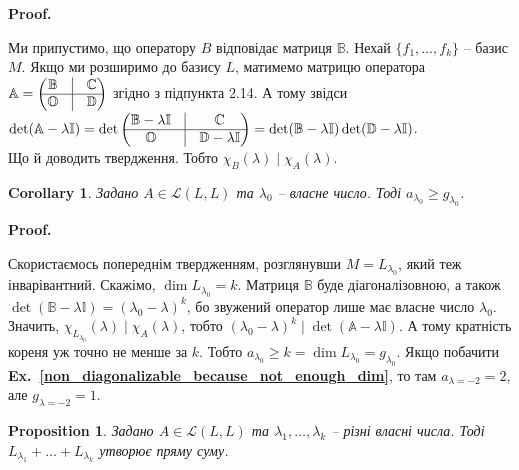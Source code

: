 \documentclass[a4paper, 10pt]{article}
\makeatletter
\theoremstyle{theoremdd}
\newtheorem{proposition}[theorem]{Proposition}
\newtheorem{corollary}[theorem]{Corollary}
\newcommand\exref[1]{\textbf{Ex.~\ref{#1}}}
\renewenvironment{proof}[1][Proof.\\]{\par
\pushQED{\hfill \qed}%
\normalfont \topsep6\p@\@plus6\p@\relax
\trivlist
\item\relax
{\bfseries
#1\@addpunct{.}}\hspace\labelsep\ignorespaces
}{%
\popQED\endtrivlist\@endpefalse
}
\makeatother
\begin{document}
\begin{proof}
Ми припустимо, що оператору $B$ відповідає матриця $\mathbb{B}$. Нехай $\{f_1,\dots,f_k\}$ -- базис $M$. Якщо ми розширимо до базису $L$, матимемо матрицю оператора $\mathbb{A} = \begin{pmatrix}
\mathbb{B} & \vline & \mathbb{C} \\
\hline
\mathbb{O} & \vline & \mathbb{D}
\end{pmatrix}$ згідно з підпункта 2.14. А тому звідси\\
$\det (\mathbb{A} - \lambda \mathbb{I}) = \det \begin{pmatrix}
\mathbb{B}- \lambda \mathbb{I} & \vline & \mathbb{C} \\
\hline
\mathbb{O} & \vline & \mathbb{D}- \lambda \mathbb{I}
\end{pmatrix} = \det(\mathbb{B}-\lambda \mathbb{I}) \det (\mathbb{D} - \lambda \mathbb{I})$.\\
Що й доводить твердження. Тобто $\chi_B(\lambda) \mid \chi_A(\lambda)$.
\end{proof}

\begin{corollary}
Задано $A \in \mathcal{L}(L,L)$ та $\lambda_0$ -- власне число. Тоді $a_{\lambda_0} \geq g_{\lambda_0}$.
\end{corollary}

\begin{proof}
Скористаємось попереднім твердженням, розглянувши $M = L_{\lambda_0}$, який теж інварівантний. Скажімо, $\dim L_{\lambda_0} = k$. Матриця $\mathbb{B}$ буде діагоналізовною, а також $\det (\mathbb{B}-\lambda \mathbb{I}) = (\lambda_0-\lambda)^k$, бо звужений оператор лише має власне число $\lambda_0$. Значить, $\chi_{L_{\lambda_0}}(\lambda) \mid \chi_A(\lambda)$, тобто $(\lambda_0-\lambda)^k \mid \det(\mathbb{A}-\lambda \mathbb{I})$. А тому кратність кореня уж точно не менше за $k$. Тобто $a_{\lambda_0} \geq k = \dim L_{\lambda_0} = g_{\lambda_0}$.
\end{proof}
\noindent
Якщо побачити \exref{non_diagonalizable_because_not_enough_dim}, то там $a_{\lambda=-2} = 2$, але $g_{\lambda = -2} = 1$.

\begin{proposition}
Задано $A \in \mathcal{L}(L,L)$ та $\lambda_1,\dots,\lambda_k$ -- різні власні числа. Тоді $L_{\lambda_1} + \dots + L_{\lambda_k}$ утворює пряму суму.
\end{proposition}
\end{document}
